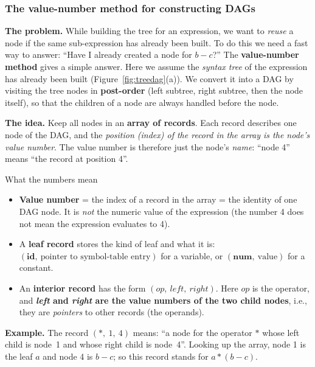 \documentclass[11pt,a4paper]{article}
\begin{document}
\subsubsection{The value-number method for constructing DAGs}
\label{sec:vn}
\textbf{The problem.} While building the tree for an expression, we want to \emph{reuse} a node if the same sub-expression has already been built. To do this we need a fast way to answer: ``Have I already created a node for $b - c$?'' The \textbf{value-number method} gives a simple answer. Here we assume the \emph{syntax tree} of the expression has already been built (Figure~\ref{fig:treedag}(a)). We convert it into a DAG by visiting the tree nodes in \textbf{post-order} (left subtree, right subtree, then the node itself), so that the children of a node are always handled before the node.

\textbf{The idea.} Keep all nodes in an \textbf{array of records}. Each record describes one node of the DAG, and the \emph{position (index) of the record in the array is the node's value number}. The value number is therefore just the node's \emph{name}: ``node 4'' means ``the record at position 4''.

\begin{defbox}{What the numbers mean}
\begin{itemize}
\item \textbf{Value number} = the index of a record in the array = the identity of one DAG node. It is \emph{not} the numeric value of the expression (the number 4 does not mean the expression evaluates to 4).
\item A \textbf{leaf record} stores the kind of leaf and what it is: $(\mathbf{id},\ \text{pointer to symbol-table entry})$ for a variable, or $(\mathbf{num},\ \text{value})$ for a constant.
\item An \textbf{interior record} has the form $(\mathit{op},\ \mathit{left},\ \mathit{right})$. Here $\mathit{op}$ is the operator, and \textbf{\textit{left} and \textit{right} are the value numbers of the two child nodes}, i.e., they are \emph{pointers} to other records (the operands).
\end{itemize}
\end{defbox}

\textbf{Example.} The record $(*,\ 1,\ 4)$ means: ``a node for the operator $*$ whose left child is node~1 and whose right child is node~4''. Looking up the array, node 1 is the leaf $a$ and node 4 is $b - c$; so this record stands for $a * (b - c)$.
\end{document}
